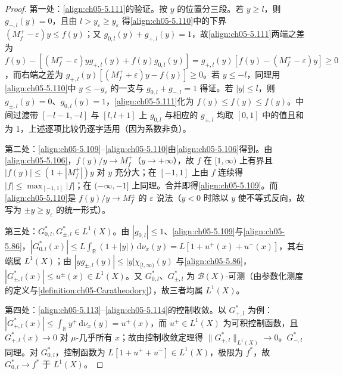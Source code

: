 \documentclass[../../main.tex]{subfiles}
\begin{document}
\begin{proof}
第一处：\eqref{align:ch05-5.111}的验证。按 $y$ 的位置分三段。若 $y\geqslant l$，则 $g_{-,l}(y)=0$，且由 $l>y_\varepsilon\geqslant y_\varepsilon$ 得\eqref{align:ch05-5.110}中的下界 $(M^+_f-\varepsilon)y\leqslant f(y)$；又 $g_{0,l}(y)+g_{+,l}(y)=1$，故\eqref{align:ch05-5.111}两端之差为 $f(y)-[(M^+_f-\varepsilon)yg_{+,l}(y)+f(y)g_{0,l}(y)]=g_{+,l}(y)[f(y)-(M^+_f-\varepsilon)y]\geqslant0$，而右端之差为 $g_{+,l}(y)[(M^+_f+\varepsilon)y-f(y)]\geqslant0$。若 $y\leqslant-l$，同理用\eqref{align:ch05-5.110}中 $y\leqslant-y_\varepsilon$ 的一支与 $g_{0,l}+g_{-,l}=1$ 得证。若 $|y|\leqslant l$，则 $g_{\pm,l}(y)=0$、$g_{0,l}(y)=1$，\eqref{align:ch05-5.111}化为 $f(y)\leqslant f(y)\leqslant f(y)$。中间过渡带 $[-l-1,-l]$ 与 $[l,l+1]$ 上 $g_{0,l}$ 与相应的 $g_{\pm,l}$ 均取 $[0,1]$ 中的值且和为 $1$，上述逐项比较仍逐字适用（因为系数非负）。

第二处：\eqref{align:ch05-5.109}--\eqref{align:ch05-5.110}由\eqref{align:ch05-5.106}得到。由\eqref{align:ch05-5.106}，$f(y)/y\to M^+_f$（$y\to+\infty$），故 $f$ 在 $[1,\infty)$ 上有界且 $|f(y)|\leqslant(1+|M^+_f|)y$ 对 $y$ 充分大；在 $[-1,1]$ 上由 $f$ 连续得 $|f|\leqslant\max_{[-1,1]}|f|$；在 $(-\infty,-1]$ 上同理。合并即得\eqref{align:ch05-5.109}。而\eqref{align:ch05-5.110}是 $f(y)/y\to M^\pm_f$ 的 $\varepsilon$ 说法（$y<0$ 时除以 $y$ 使不等式反向，故写为 $\pm y\geqslant y_\varepsilon$ 的统一形式）。

第三处：$G^*_{0,l},G^*_{\pm,l}\in L^1(X)$。由 $|g_{0,l}|\leqslant1$、\eqref{align:ch05-5.109}与\eqref{align:ch05-5.86}，$|G^*_{0,l}(x)|\leqslant L\int_{\mathbb{R}}(1+|y|)\,\mathrm{d}\nu_x(y)=L[1+u^+(x)+u^-(x)]$，其右端属 $L^1(X)$；由 $|yg_{\pm,l}(y)|\leqslant|y|\chi_{[l,\infty)}(y)$ 与\eqref{align:ch05-5.86}，$|G^*_{\pm,l}(x)|\leqslant u^\pm(x)\in L^1(X)$。又 $G^*_{0,l}$、$G^*_{\pm,l}$ 为 $\mathscr{B}(X)$-可测（由参数化测度的定义与\cref{definition:ch05-Caratheodory}），故三者均属 $L^1(X)$。

第四处：\eqref{align:ch05-5.113}--\eqref{align:ch05-5.114}的控制收敛。以 $G^*_{+,l}$ 为例：$|G^*_{+,l}(x)|\leqslant\int_{\mathbb{R}}y^+\,\mathrm{d}\nu_x(y)=u^+(x)$，而 $u^+\in L^1(X)$ 为可积控制函数，且 $G^*_{+,l}(x)\to0$ 对 $\mu$-几乎所有 $x$；故由控制收敛定理得 $\|G^*_{+,l}\|_{L^1(X)}\to0$。$G^*_{-,l}$ 同理。对 $G^*_{0,l}$，控制函数为 $L[1+u^++u^-]\in L^1(X)$，极限为 $f^*$，故 $G^*_{0,l}\to f^*$ 于 $L^1(X)$。


\end{proof}
\end{document}

